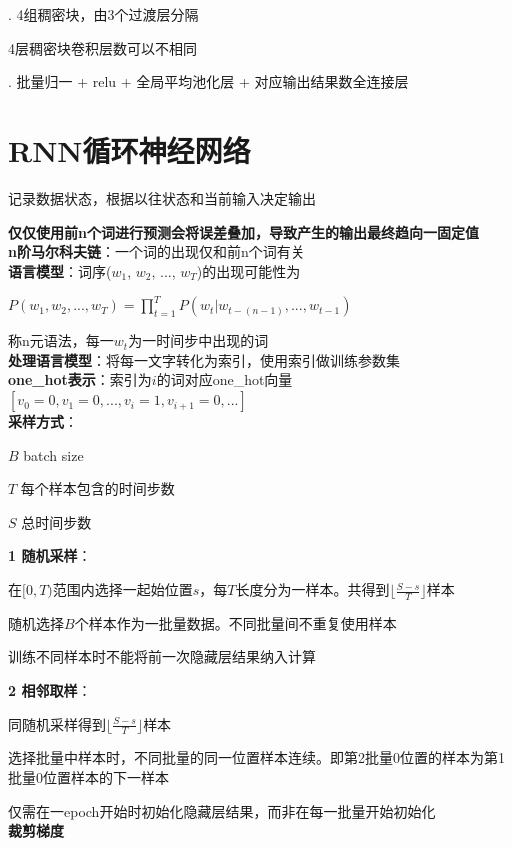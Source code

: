 \documentclass[UTF8]{ctexart}
\begin{document}
  . 4组稠密块，由3个过渡层分隔

  \quad \quad 4层稠密块卷积层数可以不相同

  . 批量归一 + relu + 全局平均池化层 + 对应输出结果数全连接层

\section{RNN循环神经网络}

\noindent 记录数据状态，根据以往状态和当前输入决定输出

  \textbf{仅仅使用前n个词进行预测会将误差叠加，导致产生的输出最终趋向一固定值}\\
\textbf{n阶马尔科夫链}：一个词的出现仅和前n个词有关\\
\textbf{语言模型}：词序($w_1$, $w_2$, ..., $w_T$)的出现可能性为

  $P(w_1, w_2,...,w_T) = \prod_{t=1}^{T} P(w_t|w_{t-(n-1)},...,w_{t-1})$

  称n元语法，每一$w_t$为一时间步中出现的词\\
\textbf{处理语言模型}：将每一文字转化为索引，使用索引做训练参数集\\
\textbf{one\_hot表示}：索引为$i$的词对应one\_hot向量$[v_0 = 0, v_1 = 0, ..., v_i = 1, v_{i+1} = 0, ...]$\\
\textbf{采样方式}：

  $B$ batch size
  
  $T$ 每个样本包含的时间步数

  $S$ 总时间步数

  \textbf{1 随机采样}：

  \quad 在$[0, T)$范围内选择一起始位置$s$，每$T$长度分为一样本。共得到$\lfloor \frac{S - s}{T} \rfloor$样本

  \quad 随机选择$B$个样本作为一批量数据。不同批量间不重复使用样本

  \quad 训练不同样本时不能将前一次隐藏层结果纳入计算
  
  \textbf{2 相邻取样}：

  \quad 同随机采样得到$\lfloor \frac{S - s}{T} \rfloor$样本

  \quad 选择批量中样本时，不同批量的同一位置样本连续。即第2批量0位置的样本为第1批量0位置样本的下一样本

  \quad 仅需在一epoch开始时初始化隐藏层结果，而非在每一批量开始初始化\\
\textbf{裁剪梯度}
\end{document}
